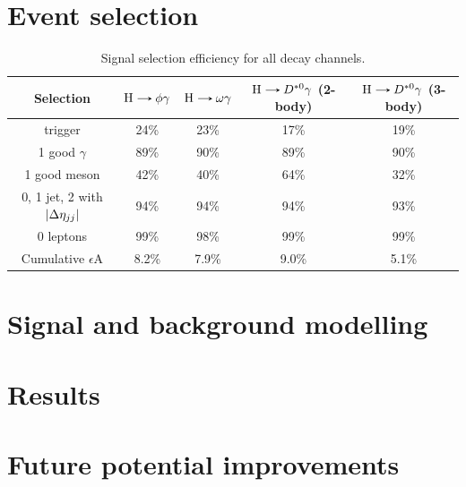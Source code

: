 
\section{Event selection}\label{sec:event_selection}

\begin{table}[!ht]
    \centering
    \begin{tabular}{|c|c|c|c|c|}
        \hline
        \cellcolor{lightgray}Selection &\cellcolor{lightgray}$\text{H}\decaysto \phi\gamma$ &\cellcolor{lightgray}$\text{H}\decaysto \omega\gamma$ &\cellcolor{lightgray}$\text{H}\decaysto D^{*0}\gamma$ {\scriptsize(2-body)}&\cellcolor{lightgray}$\text{H}\decaysto D^{*0}\gamma$ {\scriptsize(3-body)}\\ \hline
        trigger                                     & 24\%  & 23\%  & 17\%  & 19\% \\
        1 good $\gamma$                             & 89\%  & 90\%  & 89\%  & 90\% \\
        1 good meson                                & 42\%  & 40\%  & 64\%  & 32\% \\
        0, 1 jet, 2 with $\left\lvert\Delta\eta_{jj}\right\rvert$    & 94\%  & 94\%  & 94\%  & 93\% \\
        0 leptons                                   & 99\%  & 98\%  & 99\%  & 99\% \\ \hline
        Cumulative $\epsilon$A                      & 8.2\%  & 7.9\%  & 9.0\%  & 5.1\% \\
        \hline
        \end{tabular}
    \caption{Signal selection efficiency for all decay channels.}
    \label{tab:selection_efficiency}
\end{table}



\section{Signal and background modelling}\label{sec:modelling}


\section{Results}\label{sec:results}


\section{Future potential improvements}\label{sec:future_improvements}


